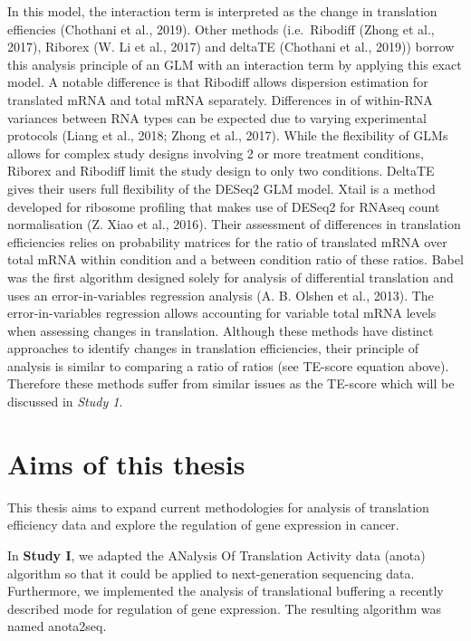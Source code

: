 \documentclass[12pt,openany]{book}
\begin{document}
In this model, the interaction term is interpreted as the change in
translation effiencies (Chothani et al., 2019). Other methods
(i.e.~Ribodiff (Zhong et al., 2017), Riborex (W. Li et al., 2017) and
deltaTE (Chothani et al., 2019)) borrow this analysis principle of an
GLM with an interaction term by applying this exact model. A notable
difference is that Ribodiff allows dispersion estimation for translated
mRNA and total mRNA separately. Differences in of within-RNA variances
between RNA types can be expected due to varying experimental protocols
(Liang et al., 2018; Zhong et al., 2017). While the flexibility of GLMs
allows for complex study designs involving 2 or more treatment
conditions, Riborex and Ribodiff limit the study design to only two
conditions. DeltaTE gives their users full flexibility of the DESeq2 GLM
model. Xtail is a method developed for ribosome profiling that makes use
of DESeq2 for RNAseq count normalisation (Z. Xiao et al., 2016). Their
assessment of differences in translation efficiencies relies on
probability matrices for the ratio of translated mRNA over total mRNA
within condition and a between condition ratio of these ratios. Babel
was the first algorithm designed solely for analysis of differential
translation and uses an error-in-variables regression analysis (A. B.
Olshen et al., 2013). The error-in-variables regression allows
accounting for variable total mRNA levels when assessing changes in
translation. Although these methods have distinct approaches to identify
changes in translation efficiencies, their principle of analysis is
similar to comparing a ratio of ratios (see TE-score equation above).
Therefore these methods suffer from similar issues as the TE-score which
will be discussed in \emph{Study 1}.

\chapter{Aims of this thesis}

This thesis aims to expand current methodologies for analysis of
translation efficiency data and explore the regulation of gene
expression in cancer.

In \textbf{Study I}, we adapted the ANalysis Of Translation Activity
data (anota) algorithm so that it could be applied to next-generation
sequencing data. Furthermore, we implemented the analysis of
translational buffering a recently described mode for regulation of gene
expression. The resulting algorithm was named anota2seq.
\end{document}
